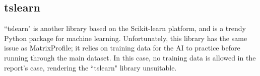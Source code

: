 \subsection{tslearn}
``tslearn" is another library based on the Scikit-learn platform, and is a trendy Python package for machine learning. Unfortunately, this library has the same issue as MatrixProfile; it relies on training data for the AI to practice before running through the main dataset. In this case, no training data is allowed in the report's case, rendering the ``tslearn" library unsuitable.
